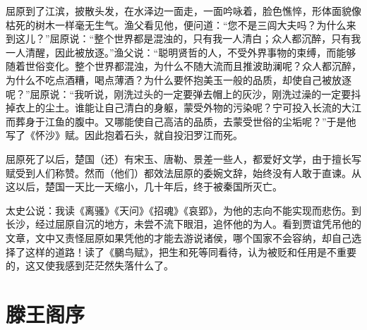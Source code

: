 \documentclass[12pt,UTF-8,openany]{ctexbook}
\begin{document}
\begin{normalsize}
    屈原到了江滨，披散头发，在水泽边一面走，一面吟咏着，脸色憔悴，形体面貌像枯死的树木一样毫无生气。渔父看见他，便问道：“您不是三闾大夫吗？为什么来到这儿？”屈原说：“整个世界都是混浊的，只有我一人清白；众人都沉醉，只有我一人清醒，因此被放逐。”渔父说：“聪明贤哲的人，不受外界事物的束缚，而能够随着世俗变化。整个世界都混浊，为什么不随大流而且推波助澜呢？众人都沉醉，为什么不吃点酒糟，喝点薄酒？为什么要怀抱美玉一般的品质，却使自己被放逐呢？”屈原说：“我听说，刚洗过头的一定要弹去帽上的灰沙，刚洗过澡的一定要抖掉衣上的尘土。谁能让自己清白的身躯，蒙受外物的污染呢？宁可投入长流的大江而葬身于江鱼的腹中。又哪能使自己高洁的品质，去蒙受世俗的尘垢呢？”于是他写了《怀沙》赋。因此抱着石头，就自投汨罗江而死。
    
    屈原死了以后，楚国（还）有宋玉、唐勒、景差一些人，都爱好文学，由于擅长写赋受到人们称赞。然而（他们）都效法屈原的委婉文辞，始终没有人敢于直谏。从这以后，楚国一天比一天缩小，几十年后，终于被秦国所灭亡。
    
    太史公说：我读《离骚》《天问》《招魂》《哀郢》，为他的志向不能实现而悲伤。到长沙，经过屈原自沉的地方，未尝不流下眼泪，追怀他的为人。看到贾谊凭吊他的文章，文中又责怪屈原如果凭他的才能去游说诸侯，哪个国家不会容纳，却自己选择了这样的道路！读了《鵩鸟赋》，把生和死等同看待，认为被贬和任用是不重要的，这又使我感到茫茫然失落什么了。
    
\end{normalsize}



\chapter{滕王阁序}
\end{document}
